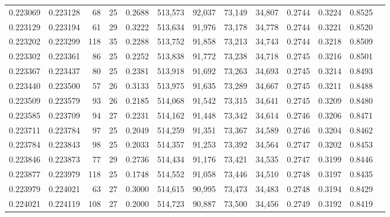 \begin{tabular}{rrrrrrrrrrrrr}
0.223069 & 0.223128 &  68 &  25 &                                     0.2688 & 513,573 &  92,037 &  73,149 &  34,807 & 0.2744 & 0.3224 & 0.8525 \\
0.223129 & 0.223194 &  61 &  29 &                                     0.3222 & 513,634 &  91,976 &  73,178 &  34,778 & 0.2744 & 0.3221 & 0.8520 \\
0.223202 & 0.223299 & 118 &  35 &                                     0.2288 & 513,752 &  91,858 &  73,213 &  34,743 & 0.2744 & 0.3218 & 0.8509 \\
0.223302 & 0.223361 &  86 &  25 &                                     0.2252 & 513,838 &  91,772 &  73,238 &  34,718 & 0.2745 & 0.3216 & 0.8501 \\
0.223367 & 0.223437 &  80 &  25 &                                     0.2381 & 513,918 &  91,692 &  73,263 &  34,693 & 0.2745 & 0.3214 & 0.8493 \\
0.223440 & 0.223500 &  57 &  26 &                                     0.3133 & 513,975 &  91,635 &  73,289 &  34,667 & 0.2745 & 0.3211 & 0.8488 \\
0.223509 & 0.223579 &  93 &  26 &                                     0.2185 & 514,068 &  91,542 &  73,315 &  34,641 & 0.2745 & 0.3209 & 0.8480 \\
0.223585 & 0.223709 &  94 &  27 &                                     0.2231 & 514,162 &  91,448 &  73,342 &  34,614 & 0.2746 & 0.3206 & 0.8471 \\
0.223711 & 0.223784 &  97 &  25 &                                     0.2049 & 514,259 &  91,351 &  73,367 &  34,589 & 0.2746 & 0.3204 & 0.8462 \\
0.223784 & 0.223843 &  98 &  25 &                                     0.2033 & 514,357 &  91,253 &  73,392 &  34,564 & 0.2747 & 0.3202 & 0.8453 \\
0.223846 & 0.223873 &  77 &  29 &                                     0.2736 & 514,434 &  91,176 &  73,421 &  34,535 & 0.2747 & 0.3199 & 0.8446 \\
0.223877 & 0.223979 & 118 &  25 &                                     0.1748 & 514,552 &  91,058 &  73,446 &  34,510 & 0.2748 & 0.3197 & 0.8435 \\
0.223979 & 0.224021 &  63 &  27 &                                     0.3000 & 514,615 &  90,995 &  73,473 &  34,483 & 0.2748 & 0.3194 & 0.8429 \\
0.224021 & 0.224119 & 108 &  27 &                                     0.2000 & 514,723 &  90,887 &  73,500 &  34,456 & 0.2749 & 0.3192 & 0.8419 \\

\end{tabular}
